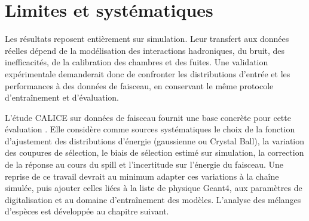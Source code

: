 \section{Limites et systématiques}
\label{sec:energie-limites}

Les résultats reposent entièrement sur simulation. Leur transfert aux données réelles dépend de la modélisation des interactions hadroniques, du bruit, des inefficacités, de la calibration des chambres et des fuites. Une validation expérimentale demanderait donc de confronter les distributions d'entrée et les performances à des données de faisceau, en conservant le même protocole d'entraînement et d'évaluation.

L'étude CALICE sur données de faisceau fournit une base concrète pour cette évaluation \cite{calice2016sdhcal}. Elle considère comme sources systématiques le choix de la fonction d'ajustement des distributions d'énergie (gaussienne ou Crystal Ball), la variation des coupures de sélection, le biais de sélection estimé sur simulation, la correction de la réponse au cours du spill et l'incertitude sur l'énergie du faisceau. Une reprise de ce travail devrait au minimum adapter ces variations à la chaîne simulée, puis ajouter celles liées à la liste de physique Geant4, aux paramètres de digitalisation et au domaine d'entraînement des modèles. L'analyse des mélanges d'espèces est développée au chapitre suivant.
